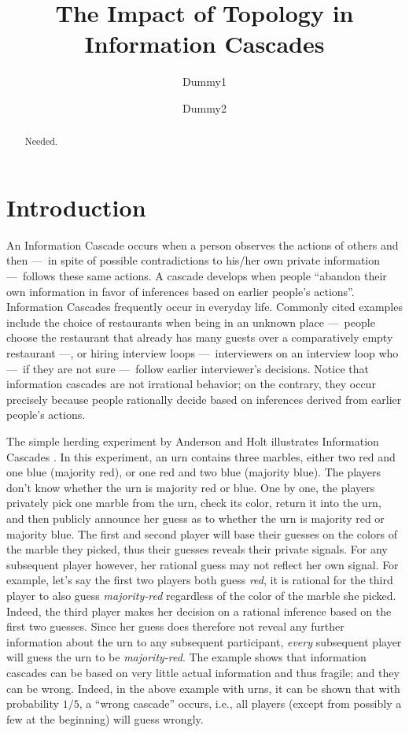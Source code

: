 \documentclass[a4paper,UKenglish]{lipics}
\title{The Impact of Topology in Information Cascades}
\author[1]{Dummy1}
\author[2]{Dummy2}
\affil[1]{Dummy University Computing Laboratory\\
  Address, Country\\
  \texttt{open@dummyuni.org}}
\affil[2]{Department of Informatics, Dummy College\\
  Address, Country\\
  \texttt{access@dummycollege.org}}
\theoremstyle{definition}
\begin{document}
\maketitle

\begin{abstract}
Needed.
\end{abstract}









\section{Introduction}

An Information Cascade occurs when a person observes the actions of others and then
	---~in spite of possible contradictions to his/her own private information
	---~follows these same actions. 
A cascade develops when people 
	``abandon their own information in favor of inferences based on earlier people's actions''\cite{Easley Book}. 
Information Cascades frequently occur in everyday life. 
Commonly cited examples include the choice of restaurants when being in an unknown place
	---~people choose the restaurant that already has many guests over a comparatively empty restaurant
	---, or hiring interview loops
	---~interviewers on an interview loop who
	---~if they are not sure
	---~follow earlier interviewer's decisions. 
Notice that information cascades are not irrational behavior; 
	on the contrary, 
	they occur precisely because people rationally decide based on inferences derived from earlier people's actions.  

The simple herding experiment by Anderson and Holt illustrates Information Cascades \cite{A.H.1, A.H.2}. 
In this experiment, an urn contains three marbles, 
	either two red and one blue (majority red), 
	or one red and two blue (majority blue). 
The players don't know whether the urn is majority red or blue. 
One by one, the players privately pick one marble from the urn, 
	check its color, return it into the urn, 
	and then publicly announce her guess as to whether the urn is majority red or majority blue. 
The first and second player will base their guesses on the colors of the marble they picked, 
	thus their guesses reveals their private signals. 
For any subsequent player however, 
	her rational guess may not reflect her own signal. 
For example, let's say the first two players both guess \emph{red}, 
	it is rational for the third player to also guess \emph{majority-red} regardless of the color of the marble she picked. 
Indeed, the third player makes her decision on a rational inference based on the first two guesses. 
Since her guess does therefore not reveal any further information about the urn to any subsequent participant, 
	\emph{every} subsequent player will guess the urn to be \emph{majority-red}. 
The example shows that information cascades can be based on very little actual information and thus fragile; 
	and they can be wrong. 
Indeed, in the above example with urns, 
	it can be shown that with probability $1/5$, a ``wrong cascade'' occurs, 
	i.e., all players (except from possibly a few at the beginning) will guess wrongly.  
\end{document}
